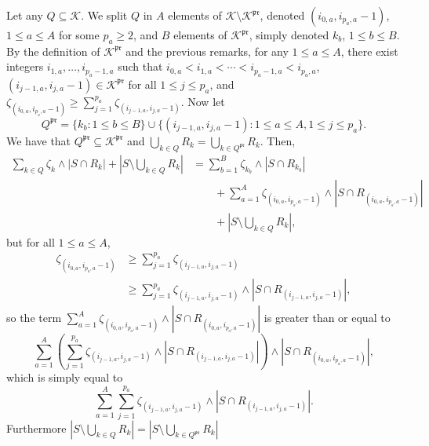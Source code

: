 \documentclass[
  11pt,
  a4paper,
]{article}
\theoremstyle{plain}
\theoremstyle{plain}
\theoremstyle{definition}
\theoremstyle{plain}
\theoremstyle{definition}
\theoremstyle{remark}
\begin{document}
Let any \(Q\subseteq \mathcal{K}\). We split \(Q\) in \(A\) elements of
\(\mathcal{K}\setminus\mathcal{K}^{\mathfrak{pr}}\), denoted
\((i_{0,a}, i_{p_a,a}-1)\), \(1\leq a\leq A\) for some \(p_a\geq2\), and
\(B\) elements of \(\mathcal{K}^{\mathfrak{pr}}\), simply denoted
\(k_b\), \(1\leq b\leq B\). By the definition of
\(\mathcal{K}^{\mathfrak{pr}}\) and the previous remarks, for any
\(1\leq a \leq A\), there exist integers \(i_{1,a},\dotsc,i_{p_a-1,a}\)
such that \(i_{0,a}<i_{1,a}<\dotsb<i_{p_a-1,a} < i_{p_a,a}\),
\((i_{j-1,a},i_{j,a}-1)\in\mathcal{K}^{\mathfrak{pr}}\) for all
\(1\leq j\leq p_a\), and
\(\zeta_{(i_{0,a}, i_{p_a,a}-1)}\geq \sum_{j=1}^{p_a}\zeta_{(i_{j-1,a},i_{j,a}-1)}\).
Now let \begin{equation}
Q^{\mathfrak{pr}}=\{k_b : 1\leq b\leq B \} \cup \{ (i_{j-1,a},i_{j,a}-1) :  1\leq a\leq A, 1\leq j\leq p_a  \}.
\label{eq_Qpr}
\end{equation} We have that
\(Q^{\mathfrak{pr}}\subseteq \mathcal{K}^{\mathfrak{pr}}\) and
\(\bigcup_{k\in Q}R_k=\bigcup_{k\in Q^{\mathfrak{pr}}}R_k\). Then,
\begin{align*}
\sum_{k\in Q}\zeta_k\wedge|S\cap R_k|+\left| S\setminus\bigcup_{k\in Q} R_k   \right|&=\sum_{b=1}^B\zeta_{k_b}\wedge|S\cap R_{k_b}| \\
&\qquad+\sum_{a=1}^A\zeta_{(i_{0,a}, i_{p_a,a}-1)}\wedge |S\cap R_{(i_{0,a}, i_{p_a,a}-1)}| \\
&\qquad+ \left| S\setminus\bigcup_{k\in Q} R_k   \right|    , 
\end{align*} but for all \(1\leq a\leq A\), \begin{align*}
\zeta_{(i_{0,a}, i_{p_a,a}-1)}&\geq  \sum_{j=1}^{p_a}\zeta_{(i_{j-1,a},i_{j,a}-1)} \\
&\geq   \sum_{j=1}^{p_a}\zeta_{(i_{j-1,a},i_{j,a}-1)} \wedge |S\cap R_{(i_{j-1,a}, i_{j,a}-1)}| ,
\end{align*} so the term
\(\sum_{a=1}^A\zeta_{(i_{0,a}, i_{p_a,a}-1)}\wedge |S\cap R_{(i_{0,a}, i_{p_a,a}-1)}|\)
is greater than or equal to \begin{equation*}
\sum_{a=1}^A\left(  \sum_{j=1}^{p_a}\zeta_{(i_{j-1,a},i_{j,a}-1)} \wedge |S\cap R_{(i_{j-1,a}, i_{j,a}-1)}| \right)\wedge |S\cap R_{(i_{0,a}, i_{p_a,a}-1)}| ,
\end{equation*} which is simply equal to \begin{equation*}
 \sum_{a=1}^A  \sum_{j=1}^{p_a}\zeta_{(i_{j-1,a},i_{j,a}-1)} \wedge |S\cap R_{(i_{j-1,a}, i_{j,a}-1)}|.
\end{equation*} Furthermore
\(\left|S\setminus\bigcup_{k\in Q} R_k\right|= \left|S\setminus\bigcup_{k\in Q^{\mathfrak{pr}}} R_k\right|\)
\end{document}
